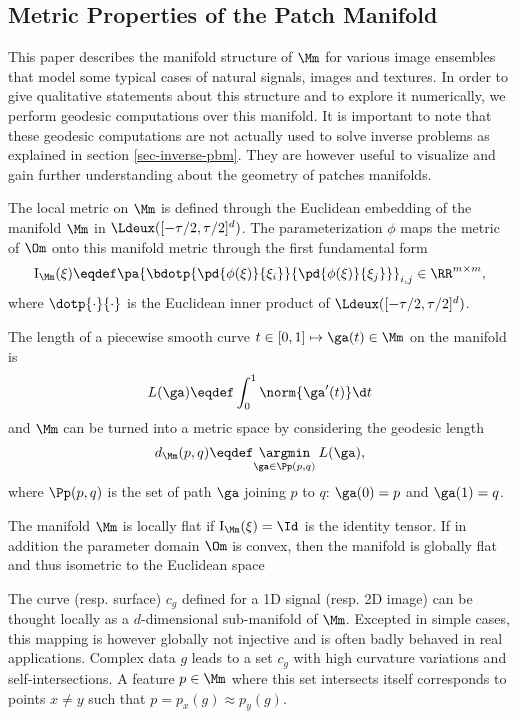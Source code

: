 
\subsection{Metric Properties of the Patch Manifold}

This paper describes the manifold structure of $\Mm$ for various image ensembles that model some typical cases of natural signals, images and textures. In order to give qualitative statements about this structure and to explore it numerically, we perform geodesic computations over this manifold. It is important to note that these geodesic computations are not actually used to solve inverse problems as explained in section \ref{sec-inverse-pbm}. They are however useful to visualize and gain further understanding about the geometry of patches manifolds.

The local metric on $\Mm$ is defined through the Euclidean embedding of the manifold $\Mm$ in $\Ldeux([-\tau/2,\tau/2]^d)$. The parameterization $\phi$ maps the metric of $\Om$ onto this manifold metric through the first fundamental form
\begin{equation*}
	\text{I}_{\Mm}(\xi) \eqdef 
	\pa{ \bdotp{ \pd{\phi(\xi)}{\xi_i} }{ \pd{\phi(\xi)}{\xi_j} } }_{i,j} \in \RR^{m \times m},
\end{equation*}
where $\dotp{\cdot}{\cdot}$ is the Euclidean inner product of $\Ldeux([-\tau/2,\tau/2]^d)$.

The length of a piecewise smooth curve $t \in [0,1] \mapsto \ga(t) \in \Mm$ on the manifold is 
\begin{equation*}
	L(\ga) \eqdef \int_0^1 \norm{\ga'(t)} \d t
\end{equation*}
and $\Mm$ can be turned into a metric space by considering the geodesic length
\begin{equation*}
	d_{\Mm}(p,q) \eqdef \underset{\ga \in \Pp(p,q)}{\argmin}\: L(\ga),
\end{equation*}
where $\Pp(p,q)$ is the set of path $\ga$ joining $p$ to $q$: $\ga(0)=p$ and $\ga(1)=q$.

The manifold $\Mm$ is locally flat if $\text{I}_{\Mm}(\xi) = \Id$ is the identity tensor. If in addition the parameter domain $\Om$ is convex, then the manifold is globally flat and thus isometric to the Euclidean space

The curve (resp. surface) $c_g$ defined for a 1D signal (resp. 2D image) can be thought locally as a $d$-dimensional sub-manifold of $\Mm$. Excepted in simple cases, this mapping is however globally not injective and is often badly behaved in real applications. Complex data $g$ leads to a set $c_g$ with high curvature variations and self-intersections. A feature $p \in \Mm$ where this set intersects itself corresponds to points $x \neq y$ such that $p = p_x(g) \approx p_y(g)$. 


